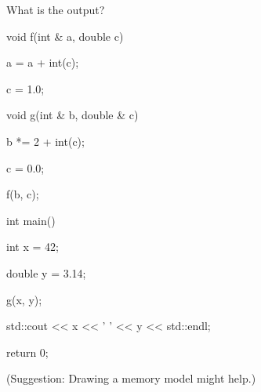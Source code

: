 What is the output?



\begin{consolethree}[escapeinside=||]

void f(int & a, double c)

{

    a = a + int(c);

    c = 1.0;

}



void g(int & b, double & c)

{

    b *= 2 + int(c);

    c = 0.0;

    f(b, c);

}



int main()

{

    int x = 42;

    double y = 3.14;

    g(x, y);

    std::cout << x << ' ' << y << std::endl;

    return 0;

}

\end{consolethree}



(Suggestion: Drawing a memory model might help.)

